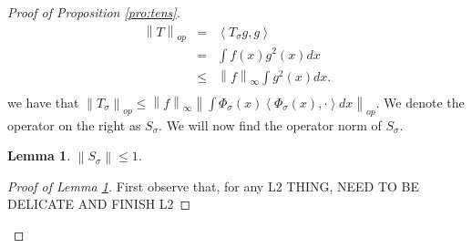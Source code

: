 \documentclass{article} %
\def\fm{{\Phi_\sigma}} %
\def\l{\left}
\def\r{\right}
\newtheorem{lem}{Lemma}
\theoremstyle{definition}
\begin{document}
\begin{proof}[Proof of Proposition \ref{pro:tens}]
\begin{eqnarray*}
            \l\|T\r\|_{op}
		&=& \l<T_\sigma g,g\r>\\
		&=&  \int f(x)g^2(x) dx\\
		&\le&  \l\|f \r\|_\infty \int   g^2(x) dx.\\
	\end{eqnarray*}
        we have that $\l\|T_\sigma \r\|_{op} \le \l\|f\r\|_\infty \l\| \int \fm(x) \l<\fm(x),\cdot\r> dx\r\|_{op}$. We denote the operator on the right as $S_\sigma$. We will now find the operator norm of $S_\sigma$.
	\begin{lem} \label{lem:opbnd}
		$\l\|S_\sigma\r\| \le 1$.
	\end{lem}
	\begin{proof}[Proof of Lemma \ref{lem:opbnd}]
                First observe that, for any L2 THING, NEED TO BE DELICATE AND FINISH L2 


\end{proof}
\end{proof}
\end{document}
